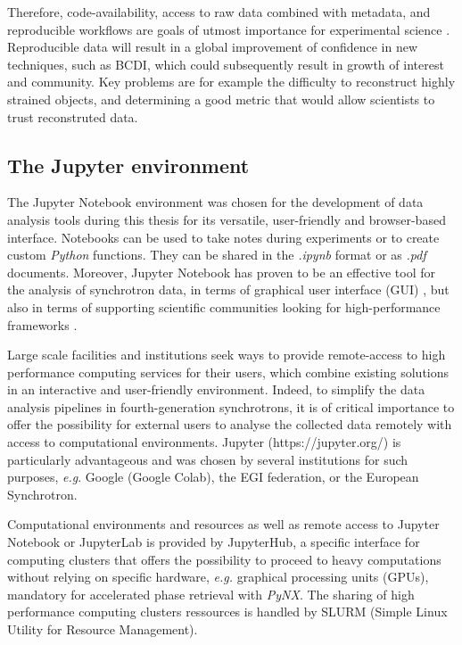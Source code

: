 Therefore, code-availability, access to raw data combined with metadata, and reproducible workflows are goals of utmost importance for experimental science \parencite{Munafo2017}.
Reproducible data will result in a global improvement of confidence in new techniques, such as BCDI, which could subsequently result in growth of interest and community.
Key problems are for example the difficulty to reconstruct highly strained objects, and determining a good metric that would allow scientists to trust reconstruted data.

\subsection{The Jupyter environment}

The Jupyter Notebook environment \parencite{IPython, Kluyver2016jupyter} was chosen for the development of data analysis tools during this thesis for its versatile, user-friendly and browser-based interface.
Notebooks can be used to take notes during experiments or to create custom \textit{Python} functions.
They can be shared in the \textit{.ipynb} format or as \textit{.pdf} documents.
Moreover, Jupyter Notebook has proven to be an effective tool for the analysis of synchrotron data, in terms of graphical user interface (GUI) \parencite{Martini2019a,Simonne2020}, but also in terms of supporting scientific communities looking for high-performance frameworks \parencite{jupyter_computing_4, jupyter_computing_1, jupyter_computing_3, jupyter_computing_2, 9307800}.

Large scale facilities and institutions seek ways to provide remote-access to high performance computing services for their users, which combine existing solutions in an interactive and user-friendly environment.
Indeed, to simplify the data analysis pipelines in fourth-generation synchrotrons, it is of critical importance to offer the possibility for external users to analyse the collected data remotely with access to computational environments.
Jupyter (https://jupyter.org/) is particularly advantageous and was chosen by several institutions for such purposes, \textit{e.g}. Google (Google Colab), the EGI federation, or the European Synchrotron.

Computational environments and resources as well as remote access to Jupyter Notebook or JupyterLab is provided by JupyterHub, a specific interface for computing clusters that offers the possibility to proceed to heavy computations without relying on specific hardware, \textit{e.g.} graphical processing units (GPUs), mandatory for accelerated phase retrieval with \textit{PyNX}.
The sharing of high performance computing clusters ressources is handled by SLURM (Simple Linux Utility for Resource Management).

